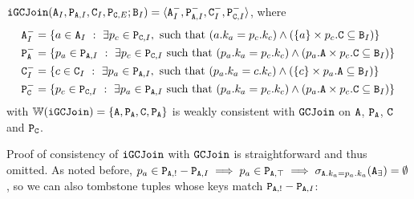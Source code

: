 \begin{example}
$\tt{iGCJoin}(\tt{A}_I, \tt{P}_{\tt{A},I}, \tt{C}_I, \tt{P}_{\tt{C},E}; \tt{B}_I) = \langle \tt{A}_I^-, \tt{P}_{\tt{A},I}^-, \tt{C}_I^-, \tt{P}_{\tt{C},I}^-\rangle$, where
\begin{align*}
\tt{A}_I^- &= \{a \in \tt{A}_I ~:~ \exists p_c \in \tt{P}_{\tt{C},I}, \text{ such that } (a.k_a = p_c.k_c) \wedge \left(\{a\} \times p_c.\tt{C} \subseteq \tt{B}_I\right)\}\\
\tt{P}_\tt{A}^- &= \{p_a \in \tt{P}_{\tt{A},I} ~:~ \exists p_c \in \tt{P}_{\tt{C},I} \text{ such that } (p_a.k_a = p_c.k_c) \wedge \left(p_a.\tt{A} \times p_c.\tt{C} \subseteq \tt{B}_I\right)\}\\
\tt{C}_I^- &= \{c \in \tt{C}_I ~:~ \exists p_a \in \tt{P}_{\tt{A},I}, \text{ such that } (p_a.k_a = c.k_c) \wedge \left(\{c\} \times p_a.\tt{A} \subseteq \tt{B}_I\right)\}\\
\tt{P}_\tt{C}^- &= \{p_c \in \tt{P}_{\tt{C},I} ~:~ \exists p_a \in \tt{P}_{\tt{A},I} \text{ such that } (p_a.k_a = p_c.k_c) \wedge \left(p_a.\tt{A} \times p_c.\tt{C} \subseteq \tt{B}_I\right)\}
\end{align*}
with $\mathbb{W}(\tt{iGCJoin}) = \{\tt{A}, \tt{P}_\tt{A}, \tt{C}, \tt{P}_\tt{A}\}$ is weakly consistent with $\tt{GCJoin}$ on $\tt{A}$, $\tt{P}_\tt{A}$, $\tt{C}$ and $\tt{P}_\tt{C}$.
\end{example}
Proof of consistency of $\tt{iGCJoin}$ with $\tt{GCJoin}$ is straightforward and thus omitted.
As noted before, $p_a \in \tt{P}_{\tt{A},!} - \tt{P}_{\tt{A},I} \implies p_a \in \tt{P}_{\tt{A},\top} \implies \sigma_{\tt{A}.k_a = p_a.k_a}(\tt{A}_\exists) = \emptyset$, so we can also tombstone tuples whose keys match $\tt{P}_{\tt{A},!} - \tt{P}_{\tt{A},I}$:

